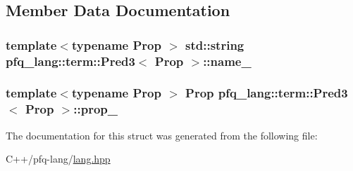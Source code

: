 \subsection{Member Data Documentation}
\hypertarget{structpfq__lang_1_1term_1_1Pred3_ac6c3e6209e74470fe1e97a1c0d7187a7}{
\subsubsection[{name\-\_\-}]{\setlength{\rightskip}{0pt plus 5cm}template$<$typename Prop $>$ std\-::string {\bf pfq\-\_\-lang\-::term\-::\-Pred3}$<$ {\bf Prop} $>$\-::name\-\_\-}}\label{structpfq__lang_1_1term_1_1Pred3_ac6c3e6209e74470fe1e97a1c0d7187a7}
\hypertarget{structpfq__lang_1_1term_1_1Pred3_aa6450a183d05751a2d9cbfcf3b01a1dd}{
\subsubsection[{prop\-\_\-}]{\setlength{\rightskip}{0pt plus 5cm}template$<$typename Prop $>$ {\bf Prop} {\bf pfq\-\_\-lang\-::term\-::\-Pred3}$<$ {\bf Prop} $>$\-::prop\-\_\-}}\label{structpfq__lang_1_1term_1_1Pred3_aa6450a183d05751a2d9cbfcf3b01a1dd}


The documentation for this struct was generated from the following file\-:\begin{DoxyCompactItemize}
\item 
C++/pfq-\/lang/\hyperlink{lang_8hpp}{lang.\-hpp}\end{DoxyCompactItemize}
